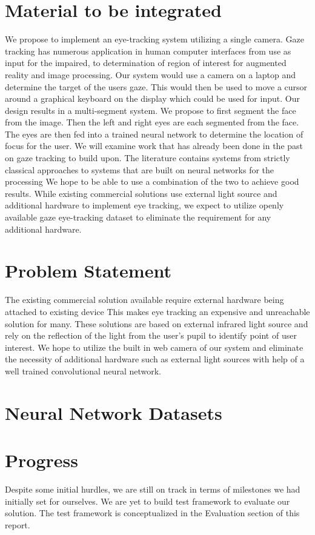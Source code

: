 \documentclass[10pt,twocolumn,letterpaper]{article}
\begin{document}
\section{Material to be integrated}


We propose to implement an eye-tracking system utilizing a single
camera. Gaze tracking has numerous application in human computer
interfaces from use as input for the impaired\cite{calvo}, to
determination of region of interest for augmented reality and image
processing. Our system would use a camera on a laptop and determine
the target of the users gaze. This would then be used to move a cursor
around a graphical keyboard on the display which could be used for
input. Our design results in a multi-segment system. We propose to
first segment the face from the image. Then the left and right eyes
are each segmented from the face. The eyes are then fed into a trained
neural network to determine the location of focus for the user. We
will examine work that has already been done in the past on gaze
tracking to build upon. The literature contains systems from strictly
classical approaches to systems that are built on neural networks for
the processing  We hope to be able to use a
combination of the two to achieve good results. While existing
commercial solutions use external light source and additional hardware
to implement eye tracking, we expect to utilize openly available gaze
eye-tracking dataset to eliminate the requirement for any additional
hardware.

\section{Problem Statement}
The existing commercial solution available require external hardware
being attached to existing device\cite{eyetrackerlist}\cite{tobii_1} This makes eye tracking an
expensive and unreachable solution for many. These solutions are based
on external infrared light source and rely on the reflection of the
light from the user’s pupil to identify point of user interest. We hope to
utilize the built in web camera of our system and eliminate the necessity
of additional hardware such as external light sources with help of a
well trained convolutional neural network.


\section{Neural Network Datasets}
\section{Progress}
Despite some initial hurdles, we are still on track in terms of milestones 
we had initially set for ourselves. We are yet to build test framework 
to evaluate our solution. The test framework is conceptualized 
in the Evaluation section of this report.
\end{document}
